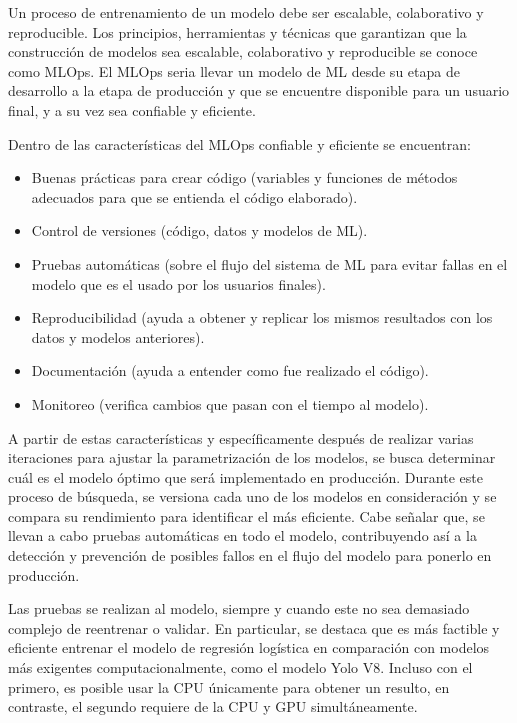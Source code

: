 Un proceso de entrenamiento de un modelo debe ser escalable, colaborativo y reproducible. Los principios, herramientas y técnicas que garantizan que la construcción de modelos sea escalable, colaborativo y reproducible se conoce como MLOps. El MLOps seria llevar un modelo de ML desde su etapa de desarrollo a la etapa de producción y que se encuentre disponible para un usuario final, y a su vez sea confiable y eficiente.

Dentro de las características del MLOps confiable y eficiente se encuentran:

\begin{itemize}
    \item Buenas prácticas para crear código (variables y funciones de métodos adecuados para que se entienda el código elaborado).
    \item Control de versiones (código, datos y modelos de ML).
    \item Pruebas automáticas (sobre el flujo del sistema de ML para evitar fallas en el modelo que es el usado por los usuarios finales).
    \item Reproducibilidad (ayuda a obtener y replicar los mismos resultados con los datos y modelos anteriores).
    \item Documentación (ayuda a entender como fue realizado el código).
    \item Monitoreo (verifica cambios que pasan con el tiempo al modelo).
\end{itemize}

\newpage

A partir de estas características y específicamente después de realizar varias iteraciones para ajustar la parametrización de los modelos, se busca determinar cuál es el modelo óptimo que será implementado en producción. Durante este proceso de búsqueda, se versiona cada uno de los modelos en consideración y se compara su rendimiento para identificar el más eficiente. Cabe señalar que, se llevan a cabo pruebas automáticas en todo el modelo, contribuyendo así a la detección y prevención de posibles fallos en el flujo del modelo para ponerlo en producción. \newline

Las pruebas se realizan al modelo, siempre y cuando este no sea demasiado complejo de reentrenar o validar. En particular, se destaca que es más factible y eficiente entrenar el modelo de regresión logística en comparación con modelos más exigentes computacionalmente, como el modelo Yolo V8. Incluso con el primero, es posible usar la CPU únicamente para obtener un resulto, en contraste, el segundo requiere de la CPU y GPU simultáneamente. \newline

